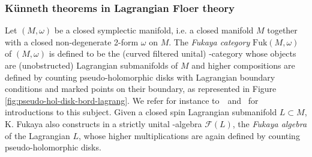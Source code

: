 \documentclass[twoside, 12pt]{amsart}
\theoremstyle{remark}
\begin{document}
\subsubsection{K\"unneth theorems in Lagrangian Floer theory}
\label{sss:amorim-fukaya}

Let $(M,\omega)$ be a closed symplectic manifold, i.e. a closed manifold $M$ together with a closed non-degenerate 2-form $\omega$ on $M$. 
The \emph{Fukaya category} $\mathrm{Fuk}(M,\omega)$ of $(M,\omega)$ is defined to be the (curved filtered unital) \Ainf -category whose objects are (unobstructed) Lagrangian submanifolds of $M$ and higher compositions are defined by counting pseudo-holomorphic disks with Lagrangian boundary conditions and marked points on their boundary, as represented in Figure \ref{fig:pseudo-hol-disk-bord-lagrang}. 
We refer for instance to~\cite{smith-prolegomenon}~and~\cite{auroux-fukaya} for introductions to this subject.
Given a closed spin Lagrangian submanifold $L \subset M$, K. Fukaya also constructs in \cite{fukaya-cyclic-symmetry} a strictly unital \Ainf -algebra $\mathcal{F}(L)$, the \emph{Fukaya algebra} of the Lagrangian $L$, whose higher multiplications are again defined by counting pseudo-holomorphic disks. 
\end{document}
